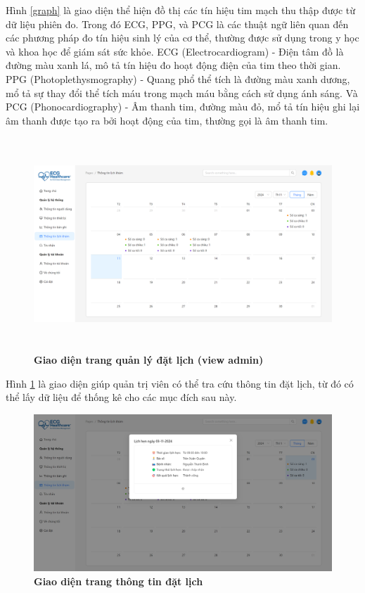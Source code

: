 Hình \ref{graph} là giao diện thể hiện đồ thị các tín hiệu tim mạch thu thập được từ dữ liệu phiên đo.
Trong đó ECG, PPG, và PCG là các thuật ngữ liên quan đến các phương pháp đo tín hiệu sinh lý của cơ thể, thường được sử dụng trong y học và khoa học để giám sát sức khỏe.
ECG (Electrocardiogram) - Điện tâm đồ là đường màu xanh lá, mô tả tín hiệu đo hoạt động điện của tim theo thời gian.
PPG (Photoplethysmography) - Quang phổ thể tích là đường màu xanh dương, mổ tả sự thay đổi thể tích máu trong mạch máu bằng cách sử dụng ánh sáng.
Và PCG (Phonocardiography) - Âm thanh tim, đường màu đỏ, mổ tả tín hiệu ghi lại âm thanh được tạo ra bởi hoạt động của tim, thường gọi là âm thanh tim.
\begin{figure}[H]
	\centering
	\includegraphics[width=15cm,height=8cm]{Images/admin_ui/schedule.png}
	\caption[Giao diện trang quản lý đặt lịch]{\bfseries \fontsize{12pt}{0pt}\selectfont Giao diện trang quản lý đặt lịch (view admin)}
	\label{schedules-admin}
\end{figure}

Hình \ref{schedules-admin} là giao diện giúp quản trị viên có thể tra cứu thông tin đặt lịch, từ đó có thể lấy dữ liệu để thống kê cho các mục đích sau này.
\begin{figure}[H]
	\centering
	\includegraphics[width=12cm]{Images/admin_ui/schedule-info.png}
	\caption[Giao diện trang thông tin đặt lịch]{\bfseries \fontsize{12pt}{0pt}\selectfont Giao diện trang thông tin đặt lịch}
	\label{schedule-info-admin}
\end{figure}

